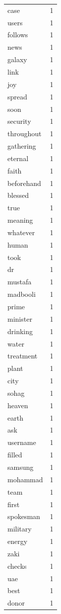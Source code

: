 \begin{tabular}{lr}
case & 1 \\
users & 1 \\
follows & 1 \\
news & 1 \\
galaxy & 1 \\
link & 1 \\
joy & 1 \\
spread & 1 \\
soon & 1 \\
security & 1 \\
throughout & 1 \\
gathering & 1 \\
eternal & 1 \\
faith & 1 \\
beforehand & 1 \\
blessed & 1 \\
true & 1 \\
meaning & 1 \\
whatever & 1 \\
human & 1 \\
took & 1 \\
dr & 1 \\
mustafa & 1 \\
madbooli & 1 \\
prime & 1 \\
minister & 1 \\
drinking & 1 \\
water & 1 \\
treatment & 1 \\
plant & 1 \\
city & 1 \\
sohag & 1 \\
heaven & 1 \\
earth & 1 \\
ask & 1 \\
username & 1 \\
filled & 1 \\
samsung & 1 \\
mohammad & 1 \\
team & 1 \\
first & 1 \\
spokesman & 1 \\
military & 1 \\
energy & 1 \\
zaki & 1 \\
checks & 1 \\
uae & 1 \\
best & 1 \\
donor & 1 \\

\end{tabular}
